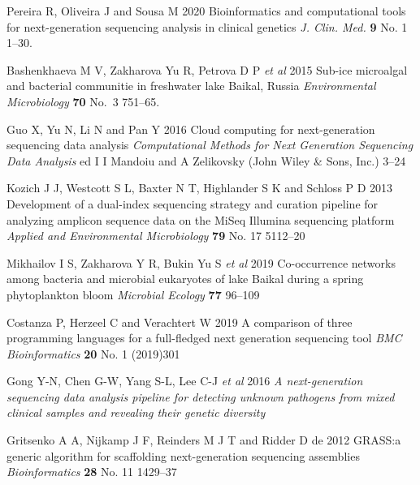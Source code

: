 \documentclass[a4paper]{jpconf}
\begin{document}
\begin{thebibliography}{0}

 Pereira R, Oliveira J and Sousa M 2020 Bioinformatics and computational tools for next-generation sequencing analysis in clinical genetics \emph{J. Clin. Med.} \textbf{9}  No. 1 1--30. 

 Bashenkhaeva M V, Zakharova Yu R, Petrova D P \emph{et al} 2015 Sub-ice microalgal and bacterial communitie in freshwater lake Baikal, Russia \emph{Environmental Microbiology} \textbf{70} No.~3 751--65. 

 Guo X, Yu N, Li N and Pan Y 2016 Cloud computing for next-generation sequencing data analysis \emph{Computational Methods for Next Generation Sequencing Data Analysis} ed I I Mandoiu and  A Zelikovsky (John Wiley \& Sons, Inc.) 3--24

 Kozich J J, Westcott S L, Baxter N T, Highlander S K and Schloss P D 2013 Development of a dual-index sequencing strategy and curation pipeline for analyzing amplicon sequence data on the MiSeq Illumina sequencing platform \emph{Applied and Environmental Microbiology} \textbf{79} No. 17 5112--20 

 Mikhailov I S, Zakharova Y R, Bukin Yu S \emph{et al} 2019 Co-occurrence networks among bacteria and microbial eukaryotes of lake Baikal during a spring phytoplankton bloom \emph{Microbial Ecology} \textbf{77} 96--109  %


 Costanza P, Herzeel C and Verachtert W 2019 A comparison of three
 programming languages for a full-fledged next generation sequencing tool \emph{BMC Bioinformatics} \textbf{20} No. 1 (2019)301 

 Gong Y-N, Chen G-W, Yang S-L, Lee C-J \emph{et al} 2016 \emph{A next-generation sequencing data analysis pipeline for detecting unknown pathogens from mixed clinical samples and revealing their genetic diversity} 

 Gritsenko A A, Nijkamp J F, Reinders M J T and Ridder D de 2012 GRASS:\@ a generic algorithm for scaffolding next-generation sequencing assemblies \emph{Bioinformatics} \textbf{28} No. 11  1429--37 


\end{thebibliography}
\end{document}
